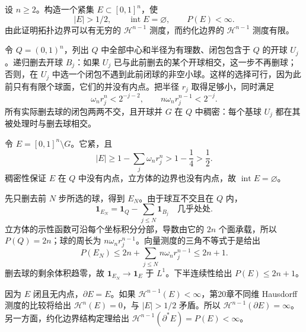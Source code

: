 \begin{exercise}\label{g3:ex:finite-perimeter-nowhere-dense}
	设 \(n\ge2\)。构造一个紧集 \(E\subset[0,1]^n\)，使
	\[
		|E|>1/2,\qquad \operatorname{int}E=\varnothing,\qquad P(E)<\infty.
	\]
	由此证明拓扑边界可以有无穷的 \(\mathcal H^{n-1}\) 测度，而约化边界的 \(\mathcal H^{n-1}\) 测度有限。
\end{exercise}
\begin{solution}
	令 \(Q=(0,1)^n\)，列出 \(Q\) 中全部中心和半径为有理数、闭包包含于 \(Q\) 的开球 \(U_j\)。递归删去开球 \(B_j\)：如果 \(U_j\) 已与此前删去的某个开球相交，这一步不再删球；否则，在 \(U_j\) 中选一个闭包不遇到此前闭球的非空小球。这样的选择可行，因为此前只有有限个球面，它们的并没有内点。把半径 \(r_j\) 取得足够小，同时满足
	\[
		\omega_n r_j^n<2^{-j-2},\qquad
		n\omega_n r_j^{n-1}<2^{-j}.
	\]
	所有实际删去球的闭包两两不交，且开球并 \(G\) 在 \(Q\) 中稠密：每个基球 \(U_j\) 都在其被处理时与删去球相交。

	令 \(E=[0,1]^n\setminus G\)。它紧，且
	\[
		|E|\ge1-\sum_j\omega_n r_j^n>1-\frac14>\frac12.
	\]
	稠密性保证 \(E\) 在 \(Q\) 中没有内点，立方体的边界也没有内点，故 \(\operatorname{int}E=\varnothing\)。

	先只删去前 \(N\) 步所选的球，得到 \(E_N\)。由于球互不交且在 \(Q\) 内，
	\[
		\mathbf1_{E_N}=\mathbf1_Q-\sum_{j\le N}\mathbf1_{B_j}
		\quad\text{几乎处处}.
	\]
	立方体的示性函数可沿每个坐标积分分部，导数由它的 \(2n\) 个面承载，所以 \(P(Q)=2n\)；球的周长为 \(n\omega_nr_j^{n-1}\)。向量测度的三角不等式于是给出
	\[
		P(E_N)\le2n+\sum_{j\le N}n\omega_nr_j^{n-1}\le2n+1.
	\]
	删去球的剩余体积趋零，故 \(\mathbf1_{E_N}\to\mathbf1_E\) 于 \(L^1\)。下半连续性给出 \(P(E)\le2n+1\)。

	因为 \(E\) 闭且无内点，\(\partial E=E\)。如果 \(\mathcal H^{n-1}(E)<\infty\)，第20章不同维 Hausdorff 测度的比较将给出 \(\mathcal H^n(E)=0\)，与 \(|E|>1/2\) 矛盾。所以 \(\mathcal H^{n-1}(\partial E)=\infty\)。另一方面，约化边界结构定理给出
	\(\mathcal H^{n-1}(\partial^*E)=P(E)<\infty\)。
\end{solution}

